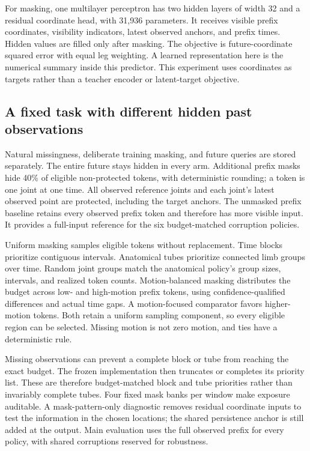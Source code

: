 \documentclass[letterpaper]{article}
\begin{document}
For masking, one multilayer perceptron has two hidden layers of width 32 and a residual coordinate head, with 31,936 parameters. It receives visible prefix coordinates, visibility indicators, latest observed anchors, and prefix times. Hidden values are filled only after masking. The objective is future-coordinate squared error with equal leg weighting. A learned representation here is the numerical summary inside this predictor. This experiment uses coordinates as targets rather than a teacher encoder or latent-target objective.

\subsection{A fixed task with different hidden past observations}

Natural missingness, deliberate training masking, and future queries are stored separately. The entire future stays hidden in every arm. Additional prefix masks hide 40\% of eligible non-protected tokens, with deterministic rounding; a token is one joint at one time. All observed reference joints and each joint's latest observed point are protected, including the target anchors. The unmasked prefix baseline retains every observed prefix token and therefore has more visible input. It provides a full-input reference for the six budget-matched corruption policies.

Uniform masking samples eligible tokens without replacement. Time blocks prioritize contiguous intervals. Anatomical tubes prioritize connected limb groups over time. Random joint groups match the anatomical policy's group sizes, intervals, and realized token counts. Motion-balanced masking distributes the budget across low- and high-motion prefix tokens, using confidence-qualified differences and actual time gaps. A motion-focused comparator favors higher-motion tokens. Both retain a uniform sampling component, so every eligible region can be selected. Missing motion is not zero motion, and ties have a deterministic rule.

Missing observations can prevent a complete block or tube from reaching the exact budget. The frozen implementation then truncates or completes its priority list. These are therefore budget-matched block and tube priorities rather than invariably complete tubes. Four fixed mask banks per window make exposure auditable. A mask-pattern-only diagnostic removes residual coordinate inputs to test the information in the chosen locations; the shared persistence anchor is still added at the output. Main evaluation uses the full observed prefix for every policy, with shared corruptions reserved for robustness.
\end{document}
